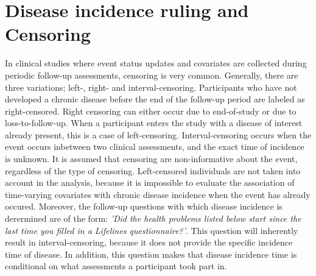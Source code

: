 \section{Disease incidence ruling and Censoring}
\label{section:data:disease_incidence_ruling_censoring}
In clinical studies where event status updates and covariates are collected during periodic follow-up assessments, censoring is very common. Generally, there are three variations; left-, right- and interval-censoring. Participants who have not developed a chronic disease before the end of the follow-up period are labeled as right-censored. Right censoring can either occur due to end-of-study or due to loss-to-follow-up. When a participant enters the study with a disease of interest already present, this is a case of left-censoring. Interval-censoring occurs when the event occurs inbetween two clinical assessments, and the exact time of incidence is unknown. It is assumed that censoring are non-informative about the event, regardless of the type of censoring. Left-censored individuals are not taken into account in the analysis, because it is impossible to evaluate the association of time-varying covariates with chronic disease incidence when the event has already occured. Moreover, the follow-up questions with which disease incidence is derermined are of the form: \textit{'Did the health problems listed below start since the last time you filled in a Lifelines questionnaire?'}. This question will inherently result in interval-censoring, because it does not provide the specific incidence time of disease. In addition, this question makes that disease incidence time is conditional on what assessments a participant took part in. 

